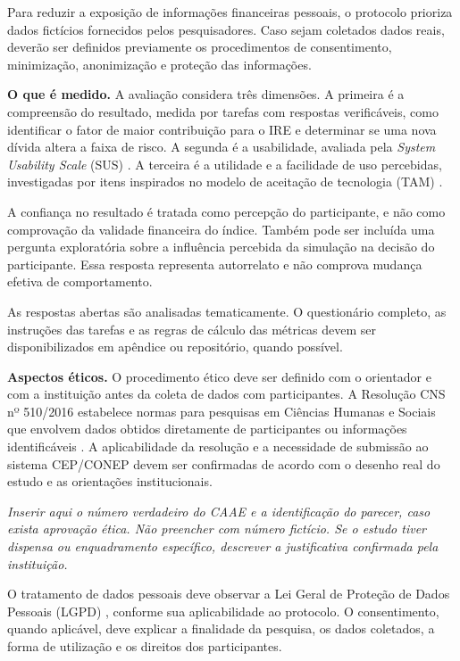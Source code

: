 \documentclass[portuguese]{sbc2025}%
\begin{document}
Para reduzir a exposição de informações financeiras pessoais, o
protocolo prioriza dados fictícios fornecidos pelos pesquisadores.
Caso sejam coletados dados reais, deverão ser definidos previamente
os procedimentos de consentimento, minimização, anonimização e
proteção das informações.

\textbf{O que é medido.}
A avaliação considera três dimensões. A primeira é a compreensão do
resultado, medida por tarefas com respostas verificáveis, como
identificar o fator de maior contribuição para o IRE e determinar se
uma nova dívida altera a faixa de risco. A segunda é a usabilidade,
avaliada pela \textit{System Usability Scale} (SUS)
\citep{brooke1996}. A terceira é a utilidade e a facilidade de uso
percebidas, investigadas por itens inspirados no modelo de aceitação
de tecnologia (TAM) \citep{davis1989}.

A confiança no resultado é tratada como percepção do participante,
e não como comprovação da validade financeira do índice. Também pode
ser incluída uma pergunta exploratória sobre a influência percebida
da simulação na decisão do participante. Essa resposta representa
autorrelato e não comprova mudança efetiva de comportamento.

As respostas abertas são analisadas tematicamente. O questionário
completo, as instruções das tarefas e as regras de cálculo das métricas
devem ser disponibilizados em apêndice ou repositório, quando possível.

\textbf{Aspectos éticos.}
O procedimento ético deve ser definido com o orientador e com a
instituição antes da coleta de dados com participantes. A Resolução
CNS nº 510/2016 estabelece normas para pesquisas em Ciências Humanas
e Sociais que envolvem dados obtidos diretamente de participantes ou
informações identificáveis \citep{cns510}. A aplicabilidade da
resolução e a necessidade de submissão ao sistema CEP/CONEP devem ser
confirmadas de acordo com o desenho real do estudo e as orientações
institucionais.

\textit{Inserir aqui o número verdadeiro do CAAE e a identificação
do parecer, caso exista aprovação ética. Não preencher com número
fictício. Se o estudo tiver dispensa ou enquadramento específico,
descrever a justificativa confirmada pela instituição.}

O tratamento de dados pessoais deve observar a Lei Geral de Proteção
de Dados Pessoais (LGPD) \citep{lgpd}, conforme sua aplicabilidade
ao protocolo. O consentimento, quando aplicável, deve explicar a
finalidade da pesquisa, os dados coletados, a forma de utilização
e os direitos dos participantes.
\end{document}
